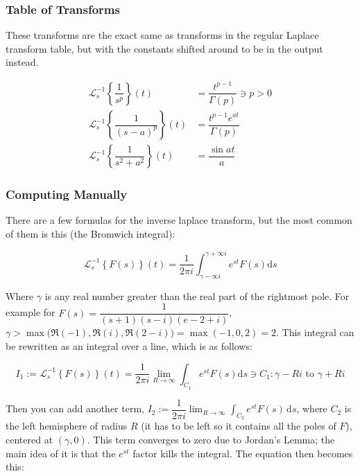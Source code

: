 \documentclass[12pt]{article}
\newcommand \dstyle \displaystyle
\newcommand \ILaplace [3] {\ensuremath{\mathscr{L}_{#1}^{-1}\!\left\{#2\right\}\!\left(#3\right)}}
\renewcommand \d [1] {\mathrm{d}{#1}}
\newcommand \ds {{\d s}}
\begin{document}
\subsubsection{Table of Transforms}\label{sec:ilaplace-table}

These transforms are the exact same as transforms in the regular Laplace transform table, but with the constants shifted around to be in the output instead.

\begin{align}
	\ILaplace{s}{\dfrac 1 {s^p}}{t} & = \dfrac{t^{p - 1}}{\Gamma(p)} \ni p > 0 \\
	\ILaplace{s}{\dfrac 1 {(s - a)^p}}{t} & = \dfrac{t^{p - 1} e^{at}}{\Gamma(p)} \\
	\ILaplace{s}{\dfrac 1 {s^2 + a^2}}{t} & = \dfrac{\sin a t} a
\end{align}

\subsubsection{Computing Manually}\label{sec:ilaplace-compute} 

There are a few formulas for the inverse laplace transform, but the most common of them is this (the Bromwich integral):

\begin{equation}
	\ILaplace{s}{F(s)}{t} = \dfrac 1 {2 \pi i} \int_{\gamma - \infty i}^{\gamma + \infty i} e^{s t} F(s) \ds
\end{equation}

Where $\gamma$ is any real number greater than the real part of the rightmost pole. For example for $F(s) = \dfrac 1 {(s + 1)(s - i) (e - 2 + i)}$, $\gamma > \max\Big(\Re(-1), \Re(i), \Re(2 - i)\Big) = \max(-1, 0, 2) = 2$. This integral can be rewritten as an integral over a line, which is as follows:

 {}
\begin{equation}
	I_1 := \ILaplace{s}{F(s)}{t} = \dfrac 1 {2 \pi i} \lim_{R \to \infty} \int_{C_1} e^{st} F(s) \ds \ni C_1 : \gamma - R i \text{ to } \gamma + R i
\end{equation}

Then you can add another term, $\dstyle I_2 := \dfrac 1 {2 \pi i} \lim_{R \to \infty} \int_{C_2} \!\! e^{st} F(s) \, \ds$, where $C_2$ is the left hemisphere of radius $R$ (it has to be left so it contains all the poles of $F$), centered at $(\gamma, 0)$. This term converges to zero due to Jordan's Lemma; the main idea of it is that the $\dstyle e^{st}$ factor kills the integral. The equation then becomes this:
\end{document}
